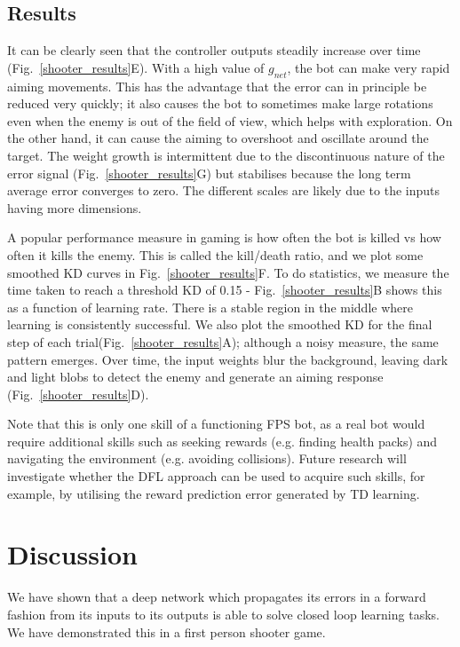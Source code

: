 \documentclass{article}
\begin{document}
\subsection{Results}
It can be clearly seen that the controller outputs steadily increase over
time (Fig.~\ref{shooter_results}E). With a high value of $g_{net}$,
the bot can make very rapid aiming movements. This has the advantage
that the error can in principle be reduced very quickly; it also
causes the bot to sometimes make large rotations even when the enemy
is out of the field of view, which helps with exploration. On the
other hand, it can cause the aiming to overshoot and oscillate around
the target. The weight growth is intermittent due to the discontinuous
nature of the error signal (Fig.~\ref{shooter_results}G) but stabilises
because the long term average error converges to zero. The different
scales are likely due to the inputs having more dimensions.

A popular performance measure in gaming is how often the bot is killed
vs how often it kills the enemy. This is called the kill/death ratio,
and we plot some smoothed KD curves in Fig.~\ref{shooter_results}F. To
do statistics, we measure the time taken to reach a threshold KD of
0.15 - Fig.~\ref{shooter_results}B shows this as a function of
learning rate. There is a stable region in the middle where
learning is consistently successful. We also plot the smoothed KD for
the final step of each trial(Fig.~\ref{shooter_results}A); although a
noisy measure, the same pattern emerges. Over time, the input weights
blur the background, leaving dark and light blobs to detect the enemy
and generate an aiming response (Fig.~\ref{shooter_results}D).

Note that this is only one skill of a functioning FPS bot, as a real
bot would require additional skills such as seeking rewards
(e.g. finding health packs) and navigating the environment
(e.g. avoiding collisions). Future research will investigate whether
the DFL approach can be used to acquire such skills, for example,
by utilising the reward prediction error generated by TD learning.


\section{Discussion}
We have shown that a deep network which propagates its errors in a
forward fashion from its inputs to its outputs is able to solve closed
loop learning tasks. We have demonstrated this in a first person
shooter game.
\end{document}
